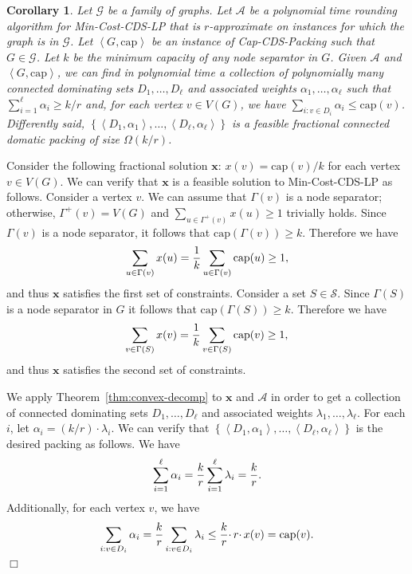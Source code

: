 \documentclass[11pt]{article}
\newtheorem{corollary}[lemma]{Corollary}
\renewenvironment{proof}{\vspace{-0.1in}\noindent{\bf Proof:}}{\hspace*{\fill}$\Box$\par}
\def\script#1{\mathcal{#1}}
\def\set#1{\left\{#1\right\}}
\def\pair#1{\left<#1\right>}
\def\sA{\script{A}}
\def\sG{\script{G}}
\def\sS{\script{S}}
\def\prob#1{\textsf{\textup{#1}}\xspace}
\def\capacity{\mathrm{cap}}
\def\minCDSlp{\prob{\minCDS-LP}}
\def\capCDSpack{\prob{Cap-CDS-Packing}}
\def\minCDS{\prob{Min-Cost-CDS}}
\def\vx{\mathrm{\mathbf{x}}}
\begin{document}
\begin{corollary} \label{cor:cds-pack-decomp}
	Let $\sG$ be a family of graphs. Let $\sA$ be a polynomial time
	rounding algorithm for \minCDSlp that is $r$-approximate on
	instances for which the graph is in $\sG$.  Let $\pair{G,
	\capacity}$ be an instance of \capCDSpack such that $G \in \sG$.
	Let $k$ be the minimum capacity of any node separator in $G$.
	Given $\sA$ and $\pair{G, \capacity}$, we can find in polynomial
	time a collection of polynomially many connected dominating sets
	$D_1, \dots, D_{\ell}$ and associated weights $\alpha_1, \dots,
	\alpha_{\ell}$ such that $\sum_{i = 1}^{\ell} \alpha_i \geq k/r$
	and, for each vertex $v \in V(G)$, we have $\sum_{i: v \in D_i}
	\alpha_i \leq \capacity(v)$. Differently said, $\set{\pair{D_1,
	\alpha_1}, \dots, \pair{D_{\ell}, \alpha_{\ell}}}$ is a feasible
	fractional connected domatic packing of size $\Omega(k/r)$.
\end{corollary}
\begin{proof}
	Consider the following fractional solution $\vx$: $x(v) =
	\capacity(v)/k$ for each vertex $v \in V(G)$. We can verify that
	$\vx$ is a feasible solution to \minCDSlp as follows. Consider a
	vertex $v$. We can assume that $\Gamma(v)$ is a node separator;
	otherwise, $\Gamma^+(v)= V(G)$ and $\sum_{u\in
	\Gamma^+(v)}x(u)\geq 1$ trivially holds. Since $\Gamma(v)$ is a
	node separator, it follows that $\capacity(\Gamma(v)) \geq k$.
	Therefore we have
		$$\sum_{u \in \Gamma(v)} x(u) = {1 \over k} \sum_{u \in
		\Gamma(v)} \capacity(u) \geq 1,$$
	and thus $\vx$ satisfies the first set of constraints. Consider a
	set $S \in \sS$. Since $\Gamma(S)$ is a node separator in $G$ it
	follows that $\capacity(\Gamma(S)) \geq k$. Therefore we have
		$$\sum_{v \in \Gamma(S)} x(v) = {1 \over k} \sum_{v \in
		\Gamma(S)} \capacity(v) \geq 1,$$
	and thus $\vx$ satisfies the second set of constraints.

	We apply Theorem~\ref{thm:convex-decomp} to $\vx$ and $\sA$ in
	order to get a collection of connected dominating sets $D_1,
	\dots, D_{\ell}$ and associated weights $\lambda_1, \dots,
	\lambda_{\ell}$. For each $i$, let $\alpha_i = (k/r) \cdotp
	\lambda_i$. We can verify that $\set{\pair{D_1, \alpha_1}, \dots,
	\pair{D_{\ell}, \alpha_{\ell}}}$ is the desired packing as
	follows. We have
		$$\sum_{i = 1}^{\ell} \alpha_i = {k \over r} \sum_{i =
		1}^{\ell} \lambda_i = {k \over r}.$$
	Additionally, for each vertex $v$, we have
		$$\sum_{i: v \in D_i} \alpha_i = {k \over r} \sum_{i: v \in
		D_i} \lambda_i \leq {k \over r} \cdotp r \cdotp x(v) =
		\capacity(v).$$
\end{proof}
\end{document}
